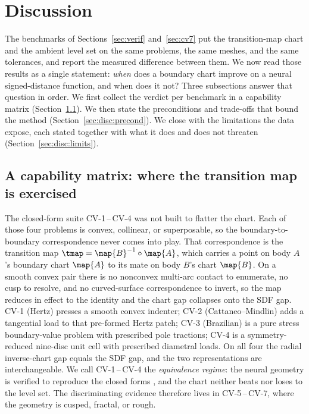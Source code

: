 \section{Discussion}\label{sec:disc}

The benchmarks of Sections~\ref{sec:verif} and~\ref{sec:cv7} put the transition-map chart and the
ambient level set on the same problems, the same meshes, and the same tolerances, and report the
measured difference between them. We now read those results as a single statement: \emph{when} does a
boundary chart improve on a neural signed-distance function, and when does it not? Three subsections
answer that question in order. We first collect the verdict per benchmark in a capability matrix
(Section~\ref{sec:disc:matrix}). We then state the preconditions and trade-offs that bound the method
(Section~\ref{sec:disc:precond}). We close with the limitations the data expose, each stated together
with what it does and does not threaten (Section~\ref{sec:disc:limits}).

\subsection{A capability matrix: where the transition map is exercised}\label{sec:disc:matrix}

The closed-form suite CV-1\,--\,CV-4 was not built to flatter the chart. Each of those four problems is
convex, collinear, or superposable, so the boundary-to-boundary correspondence never comes into play.
That correspondence is the transition map $\tmap=\map{B}^{-1}\circ\map{A}$, which carries a point on
body $A$'s boundary chart $\map{A}$ to its mate on body $B$'s chart $\map{B}$. On a smooth convex pair
there is no nonconvex multi-arc contact to enumerate, no cusp to resolve, and no curved-surface
correspondence to invert, so the map reduces in effect to the identity and the chart gap collapses onto
the SDF gap. CV-1 (Hertz) presses a smooth convex indenter; CV-2 (Cattaneo--Mindlin) adds a tangential
load to that pre-formed Hertz patch; CV-3 (Brazilian) is a pure stress boundary-value problem with
prescribed pole tractions; CV-4 is a symmetry-reduced nine-disc unit cell with prescribed diametral
loads. On all four the radial inverse-chart gap equals the SDF gap, and the two representations are
interchangeable. We call CV-1\,--\,CV-4 the \emph{equivalence regime}: the neural geometry is verified
to reproduce the closed forms
\citep{johnson1985contact,timoshenko1970elasticity,mindlin1949compliance,hondros1959evaluation}, and the
chart neither beats nor loses to the level set. The discriminating evidence therefore lives in
CV-5\,--\,CV-7, where the geometry is cusped, fractal, or rough.

